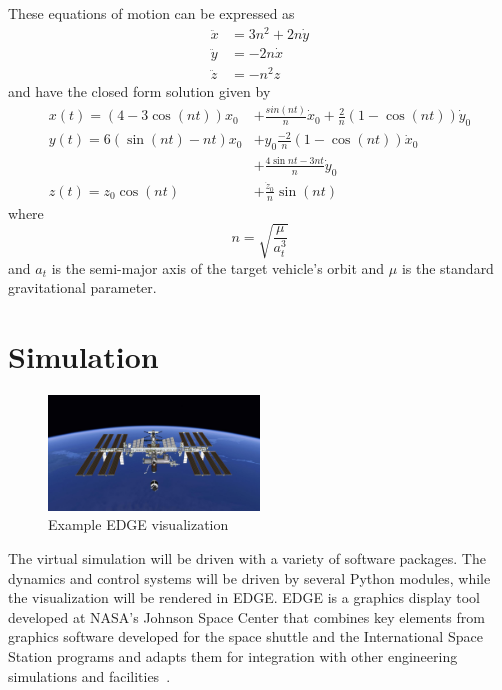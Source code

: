 \documentclass[journal, 10pt]{IEEEtran}
\begin{document}
These equations of motion can be expressed as
\begin{equation}
\begin{split}
\ddot{x} &= 3n^2 + 2n\dot y \\
\ddot{y} &= -2n\dot x \\
\ddot{z} &= -n^2z
\end{split}
\end{equation}
and have the closed form solution given by
\begin{equation}
\begin{split}
x(t) = (4-3 \cos{(nt)})x_0 &+ \frac{sin{(nt)}}{n}\dot x_0 + \frac{2}{n} (1 - \cos(nt))\dot y_0\\
y(t) = 6(\sin{(nt)}-nt)x_0 &+ y_0 \frac{-2}{n}(1 - \cos{(nt)})\dot x_0 \\
                         &+ \frac{4 \sin{nt} - 3nt}{n}\dot y_0 \\
z(t) = z_0 \cos{(nt)} &+ \frac{\dot z_0}{n} \sin{(nt)}
\end{split}
\end{equation}
where
\begin{equation}
n = \sqrt{\frac{\mu}{a^3_t}}
\end{equation}
and $a_t$ is the semi-major axis of the target vehicle's orbit and $\mu$ is the standard gravitational parameter.

\section{Simulation}

\begin{figure}[tb]
\begin{center}
\includegraphics[width=0.5\textwidth]{figures/EDGE_ISS.jpeg}
\caption{Example EDGE visualization}
\label{edge_iss}
\end{center}
\end{figure}

The virtual simulation will be driven with a variety of software packages. The dynamics and control systems will be driven by several Python modules, while the visualization will be rendered in EDGE. EDGE is a graphics display tool developed at NASA's Johnson Space Center that combines key elements from graphics software developed for the space shuttle and the International Space Station programs and adapts them for integration with other engineering simulations and facilities~\cite{EDGE}.
\end{document}
